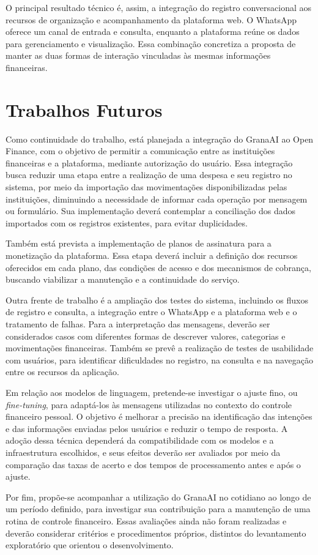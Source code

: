O principal resultado técnico é, assim, a integração do registro conversacional aos recursos de organização e acompanhamento da plataforma web. O WhatsApp oferece um canal de entrada e consulta, enquanto a plataforma reúne os dados para gerenciamento e visualização. Essa combinação concretiza a proposta de manter as duas formas de interação vinculadas às mesmas informações financeiras.

\section{Trabalhos Futuros}
\label{sec:trabalhos-futuros}

Como continuidade do trabalho, está planejada a integração do GranaAI ao Open Finance, com o objetivo de permitir a comunicação entre as instituições financeiras e a plataforma, mediante autorização do usuário. Essa integração busca reduzir uma etapa entre a realização de uma despesa e seu registro no sistema, por meio da importação das movimentações disponibilizadas pelas instituições, diminuindo a necessidade de informar cada operação por mensagem ou formulário. Sua implementação deverá contemplar a conciliação dos dados importados com os registros existentes, para evitar duplicidades.

Também está prevista a implementação de planos de assinatura para a monetização da plataforma. Essa etapa deverá incluir a definição dos recursos oferecidos em cada plano, das condições de acesso e dos mecanismos de cobrança, buscando viabilizar a manutenção e a continuidade do serviço.

Outra frente de trabalho é a ampliação dos testes do sistema, incluindo os fluxos de registro e consulta, a integração entre o WhatsApp e a plataforma web e o tratamento de falhas. Para a interpretação das mensagens, deverão ser considerados casos com diferentes formas de descrever valores, categorias e movimentações financeiras. Também se prevê a realização de testes de usabilidade com usuários, para identificar dificuldades no registro, na consulta e na navegação entre os recursos da aplicação.

Em relação aos modelos de linguagem, pretende-se investigar o ajuste fino, ou \textit{fine-tuning}, para adaptá-los às mensagens utilizadas no contexto do controle financeiro pessoal. O objetivo é melhorar a precisão na identificação das intenções e das informações enviadas pelos usuários e reduzir o tempo de resposta. A adoção dessa técnica dependerá da compatibilidade com os modelos e a infraestrutura escolhidos, e seus efeitos deverão ser avaliados por meio da comparação das taxas de acerto e dos tempos de processamento antes e após o ajuste.

Por fim, propõe-se acompanhar a utilização do GranaAI no cotidiano ao longo de um período definido, para investigar sua contribuição para a manutenção de uma rotina de controle financeiro. Essas avaliações ainda não foram realizadas e deverão considerar critérios e procedimentos próprios, distintos do levantamento exploratório que orientou o desenvolvimento.
